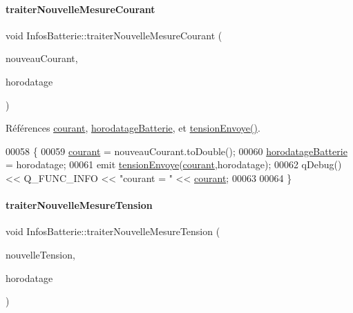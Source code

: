 \paragraph{\texorpdfstring{traiter\+Nouvelle\+Mesure\+Courant}{traiterNouvelleMesureCourant}}
{\footnotesize\ttfamily void Infos\+Batterie\+::traiter\+Nouvelle\+Mesure\+Courant (\begin{DoxyParamCaption}\item[{Q\+String}]{nouveau\+Courant,  }\item[{Q\+String}]{horodatage }\end{DoxyParamCaption})\hspace{0.3cm}{\ttfamily [slot]}}



Références \hyperlink{class_infos_batterie_a417f025b2ccddea7d28f80df4413945a}{courant}, \hyperlink{class_infos_batterie_a261067aff87023bccd60e59961ef1ffc}{horodatage\+Batterie}, et \hyperlink{class_infos_batterie_a932a48aafb94e5289d775bb3305fdb74}{tension\+Envoye()}.


\begin{DoxyCode}
00058 \{
00059     \hyperlink{class_infos_batterie_a417f025b2ccddea7d28f80df4413945a}{courant} = nouveauCourant.toDouble();
00060     \hyperlink{class_infos_batterie_a261067aff87023bccd60e59961ef1ffc}{horodatageBatterie} = horodatage;
00061     emit \hyperlink{class_infos_batterie_a932a48aafb94e5289d775bb3305fdb74}{tensionEnvoye}(\hyperlink{class_infos_batterie_a417f025b2ccddea7d28f80df4413945a}{courant},horodatage);
00062     qDebug() << Q\_FUNC\_INFO << \textcolor{stringliteral}{"courant = "} << \hyperlink{class_infos_batterie_a417f025b2ccddea7d28f80df4413945a}{courant};
00063 
00064 \}
\end{DoxyCode}
\mbox{\label{class_infos_batterie_a8b1c1008d441b30f2cf38995fae3e0ca}} 
\paragraph{\texorpdfstring{traiter\+Nouvelle\+Mesure\+Tension}{traiterNouvelleMesureTension}}
{\footnotesize\ttfamily void Infos\+Batterie\+::traiter\+Nouvelle\+Mesure\+Tension (\begin{DoxyParamCaption}\item[{Q\+String}]{nouvelle\+Tension,  }\item[{Q\+String}]{horodatage }\end{DoxyParamCaption})\hspace{0.3cm}{\ttfamily [slot]}}



